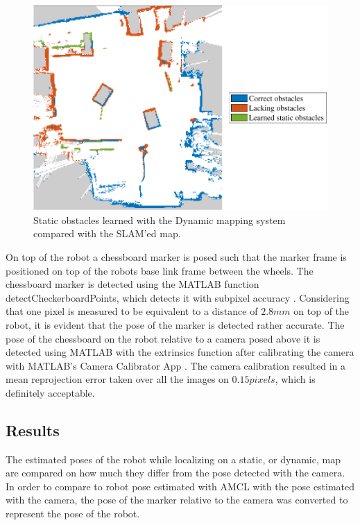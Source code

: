 \begin{figure}
    \centering
    \includegraphics[scale=1]{chapters/evaluation/figures/static_classified_localization_test-crop}
    \caption{Static obstacles learned with the Dynamic mapping system compared with the SLAM'ed map.}
    \label{fig:static_classified_localization_test-crop}
\end{figure}

On top of the robot a chessboard marker is posed such that the marker frame is positioned on top of the robots base link frame between the wheels.
The chessboard marker is detected using the MATLAB function detectCheckerboardPoints, which detects it with subpixel accuracy \cite{matlab_detect_checkerboard}.
Considering that one pixel is measured to be equivalent to a distance of $2.8mm$ on top of the robot, it is evident that the pose of the marker is detected rather accurate.
The pose of the chessboard on the robot relative to a camera posed above it is detected using MATLAB with the extrinsics function \cite{matlab_extrinsics} after calibrating the camera with MATLAB's Camera Calibrator App  \cite{camera_calibrator_app}. 
The camera calibration resulted in a mean reprojection error taken over all the images on $0.15pixels$, which is definitely acceptable.

\subsection{Results}
The estimated poses of the robot while localizing on a static, or dynamic, map are compared on how much they differ from the pose detected with the camera.
In order to compare to robot pose estimated with AMCL with the pose estimated with the camera, the pose of the marker relative to the camera was converted to represent the pose of the robot.

